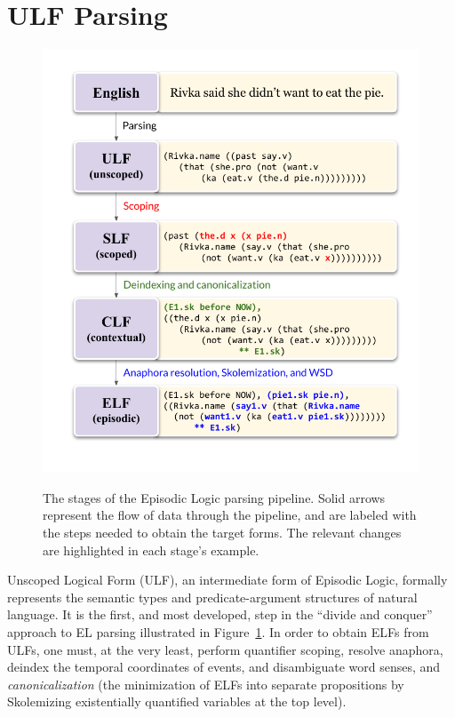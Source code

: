 \section{ULF Parsing}

\begin{figure}
\centering
\includegraphics[width=\columnwidth]{CH2_el/el_pipeline.pdf}
\label{fig:el_pipeline}
\caption{The stages of the Episodic Logic parsing pipeline. Solid arrows represent the flow of data through the pipeline, and are labeled with the steps needed to obtain the target forms. The relevant changes are highlighted in each stage's example.}
\end{figure}

\label{subsec:ulf}
Unscoped Logical Form (ULF), an intermediate form of Episodic Logic, formally represents the semantic types and predicate-argument structures of natural language. It is the first, and most developed, step in the ``divide and conquer'' approach to EL parsing illustrated in Figure~\ref{fig:el_pipeline}. In order to obtain ELFs from ULFs, one must, at the very least, perform quantifier scoping, resolve anaphora, deindex the temporal coordinates of events, and disambiguate word senses, and \textit{canonicalization} (the minimization of ELFs into separate propositions by Skolemizing existentially quantified variables at the top level).

